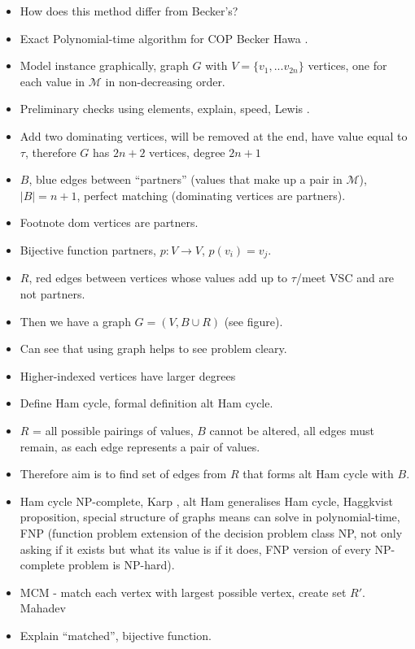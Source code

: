 \documentclass{elsarticle}
\begin{document}
{\color{Cerulean}
\begin{itemize}
	\item \alert{How does this method differ from Becker's?}
	\item Exact Polynomial-time algorithm for COP Becker \cite{becker2015} Hawa \cite{hawa2018}.
	\item Model instance graphically, graph $G$ with $V = \{v_1, ...v_{2n}\}$ vertices, one for each value in $\mathcal{M}$ in non-decreasing order.
	\item Preliminary checks using elements, explain, speed, Lewis \cite{lewis2011}.
	\item Add two dominating vertices, will be removed at the end, have value equal to $\tau$, therefore $G$ has $2n+2$ vertices, degree $2n+1$
	\item $B$, blue edges between ``partners'' (values that make up a pair in $\mathcal{M}$), $|B| = n+1$, perfect matching (dominating vertices are partners).
	\item Footnote dom vertices are partners.
	\item Bijective function partners, $p : V \to V$, $p(v_i) = v_j$.
	\item $R$, red edges between vertices whose values add up to $\tau$/meet VSC and are not partners.
	\item Then we have a graph $G = (V, B \cup R)$ (see figure).
	\item Can see that using graph helps to see problem cleary.
	\item Higher-indexed vertices have larger degrees
	\item Define Ham cycle, formal definition alt Ham cycle.
	\item $R$ = all possible pairings of values, $B$ cannot be altered, all edges must remain, as each edge represents a pair of values.
	\item Therefore aim is to find set of edges from $R$ that forms alt Ham cycle with $B$.
	\item Ham cycle NP-complete, Karp \cite{karp1972}, alt Ham generalises Ham cycle, Haggkvist \cite{haggkvist1977} proposition, special structure of graphs means can solve in polynomial-time, FNP (function problem extension of the decision problem class NP, not only asking if it exists but what its value is if it does, FNP version of every NP-complete problem is NP-hard).
	\item MCM - match each vertex with largest possible vertex, create set $R'$. Mahadev \cite{mahadev1994}
	\item Explain ``matched'', bijective function.

\end{itemize}}
\end{document}
